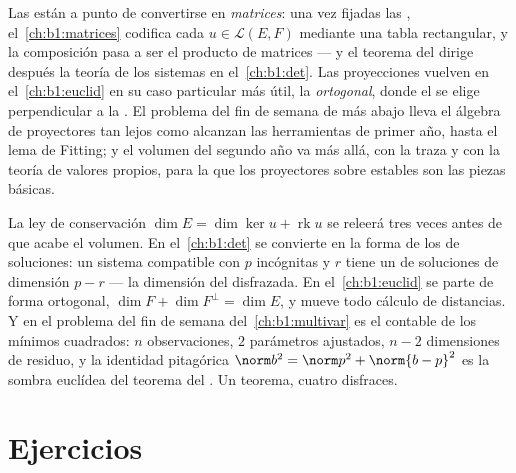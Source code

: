 \begin{remark}
\label{rem:b1:linmaps:whereused}
Las  están a punto de convertirse en
\emph{matrices}: una vez fijadas las ,
el~\cref{ch:b1:matrices} codifica cada $u \in \mathcal{L}(E, F)$
mediante una tabla rectangular, y la composición pasa a ser el
producto de matrices --- y el teorema del  dirige después la
teoría de los sistemas  en el~\cref{ch:b1:det}. Las
proyecciones vuelven en el~\cref{ch:b1:euclid} en su caso
particular más útil, la  \emph{ortogonal}, donde el
 se elige perpendicular a la . El problema del fin de
semana de más abajo lleva el álgebra de proyectores tan lejos como
alcanzan las herramientas de primer año, hasta el lema de Fitting; y
el volumen del segundo año va más allá, con la traza y con la teoría
de valores propios, para la que los proyectores sobre 
estables son las piezas básicas.
\end{remark}

\begin{remark}
\label{rem:b1:linmaps:perspectives}
La ley de conservación $\dim E = \dim\ker u + \operatorname{rk} u$ se
releerá tres veces antes de que acabe el volumen. En
el~\cref{ch:b1:det} se convierte en la forma de los  de
soluciones: un sistema compatible con $p$ incógnitas y  $r$
tiene un  de soluciones de dimensión $p - r$ --- la dimensión
del  disfrazada. En el~\cref{ch:b1:euclid} se parte de forma
ortogonal, $\dim F + \dim F^\perp = \dim E$, y mueve todo cálculo de
distancias. Y en el problema del fin de semana
del~\cref{ch:b1:multivar} es el contable de los mínimos cuadrados:
$n$ observaciones, $2$ parámetros ajustados, $n - 2$ dimensiones de
residuo, y la identidad pitagórica
$\norm b^2 = \norm p^2 + \norm{b - p}^2$ es la sombra euclídea del
teorema del . Un teorema, cuatro disfraces.
\end{remark}

\section{Ejercicios}

